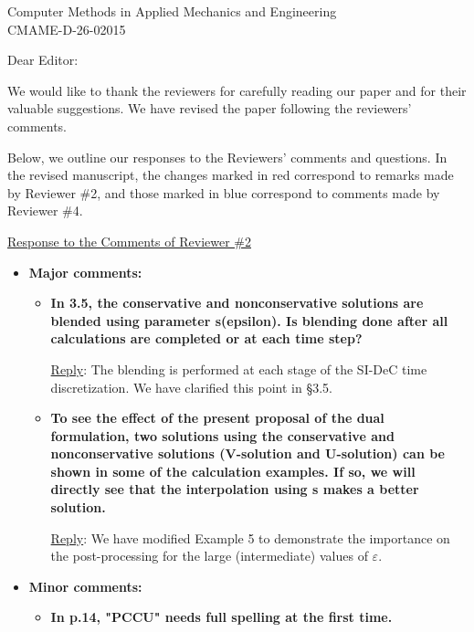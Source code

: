 \documentclass[letter,11pt]{letter}
\theoremstyle{remark}
\begin{document}
\begin{letter}{Computer Methods in Applied Mechanics and Engineering\\
CMAME-D-26-02015}

\opening{Dear Editor:} %
We would like to thank the reviewers for carefully reading our paper and for their valuable suggestions. We have revised the paper following
the reviewers' comments.

Below, we outline our responses to the Reviewers' comments and questions. In the revised manuscript, the changes marked in {\color{red}red}
correspond to remarks made by Reviewer \#2, and those marked in {\color{blue}blue} correspond to comments made by Reviewer \#4.

\bigskip
\underline{Response to the Comments of Reviewer \#2}

\begin{itemize}[wide, labelwidth=!, labelindent=0pt]
\item
{\bf Major comments:}

\begin{itemize}[wide, labelwidth=!, labelindent=0pt]
\item{\bf In 3.5, the conservative and nonconservative solutions are blended using parameter s(epsilon). Is blending done after all
calculations are completed or at each time step?}

\smallskip
{\sc\underline{Reply}}: The blending is performed at each stage of the SI-DeC time discretization. We have clarified this point in \S3.5.

\medskip
\item{\bf To see the effect of the present proposal of the dual formulation, two solutions using the conservative and nonconservative
solutions (V-solution and U-solution) can be shown in some of the calculation examples. If so, we will directly see that the interpolation
using s makes a better solution.}

\smallskip
{\sc\underline{Reply}}: We have modified Example 5 to demonstrate the importance on the post-processing for the large (intermediate) values
of $\varepsilon$.
\end{itemize}

\medskip
\item
{\bf Minor comments:}

\begin{itemize}[wide, labelwidth=!, labelindent=0pt]
\item{\bf In p.14, "PCCU" needs full spelling at the first time.}


\end{itemize}
\end{itemize}
\end{letter}
\end{document}
